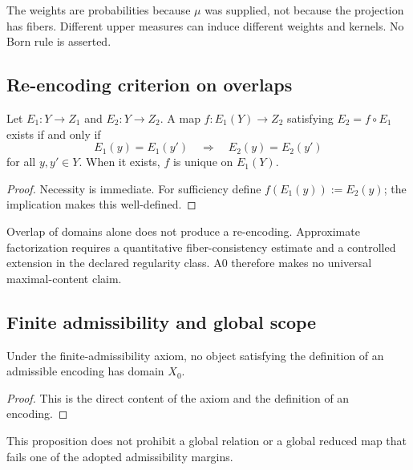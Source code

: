 \documentclass[11pt]{article}
\theoremstyle{plain}
\theoremstyle{plain}
\begin{document}
\begin{remark}
The weights are probabilities because $\mu$ was supplied, not because the
projection has fibers.  Different upper measures can induce different
weights and kernels.  No Born rule is asserted.
\end{remark}


\subsection{Re-encoding criterion on overlaps}

\begin{theorem}\label{thm:encoding-factor}
Let $E_1:Y\to Z_1$ and $E_2:Y\to Z_2$.  A map
$f:E_1(Y)\to Z_2$ satisfying $E_2=f\circ E_1$ exists if and only if
\[
E_1(y)=E_1(y')\quad\Longrightarrow\quad E_2(y)=E_2(y')
\]
for all $y,y'\in Y$.  When it exists, $f$ is unique on $E_1(Y)$.
\end{theorem}

\begin{proof}
Necessity is immediate.  For sufficiency define
$f(E_1(y)):=E_2(y)$; the implication makes this well-defined.
\end{proof}

\begin{remark}
Overlap of domains alone does not produce a re-encoding.  Approximate
factorization requires a quantitative fiber-consistency estimate and a
controlled extension in the declared regularity class.  A0 therefore makes
no universal maximal-content claim.
\end{remark}

\subsection{Finite admissibility and global scope}

\begin{proposition}
Under the finite-admissibility axiom, no object satisfying the definition of
an admissible encoding has domain $X_0$.
\end{proposition}

\begin{proof}
This is the direct content of the axiom and the definition of an encoding.
\end{proof}

\begin{remark}
This proposition does not prohibit a global relation or a global reduced map
that fails one of the adopted admissibility margins.
\end{remark}
\end{document}
